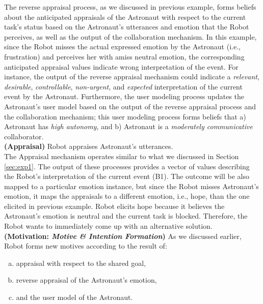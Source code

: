 The reverse appraisal process, as we discussed in previous example, forms
beliefs about the anticipated appraisals of the Astronaut with respect to the
current task's status based on the Astronaut's utterances and emotion that the
Robot perceives, as well as the output of the collaboration mechanism. In this
example, since the Robot misses the actual expressed emotion by the Astronaut
(i.e., frustration) and perceives her with amiss neutral emotion, the
corresponding anticipated appraisal values indicate wrong interpretation of the
event. For instance, the output of the reverse appraisal mechanism could
indicate a \textit{relevant}, \textit{desirable}, \textit{controllable},
\textit{non-urgent}, and \textit{expected} interpretation of the current event
by the Astronaut. Furthermore, the user modeling process updates the Astronaut's
user model based on the output of the reverse appraisal process and the
collaboration mechanism; this user modeling process forms beliefs that a)
Astronaut has \textit{high autonomy}, and b) Astronaut is a
\textit{moderately communicative} collaborator.\\

\noindent\textbf{(Appraisal)} Robot appraises Astronaut's utterances.\\

The Appraisal mechanism operates similar to what we discussed in Section
\ref{sec:exp1}. The output of these processes provides a vector of values
describing the Robot's interpretation of the current event (B1). The outcome
will be also mapped to a particular emotion instance, but since the Robot misses
Astronaut's emotion, it maps the appraisals to a different emotion, i.e.,
hope, than the one elicited in previous example. Robot elicits hope because it
believes the Astronaut's emotion is neutral and the current task is blocked.
Therefore, the Robot wants to immediately come up with an alternative
solution.\\

\noindent\textbf{(Motivation: \textit{Motive \& Intention Formation})} As
we discussed earlier, Robot forms new motives according to the result of:

\begin{enumerate}[a)]
  \item appraisal with respect to the shared goal,
  \item reverse appraisal of the Astronaut's emotion,
  \item and the user model of the Astronaut. 
\end{enumerate} 

